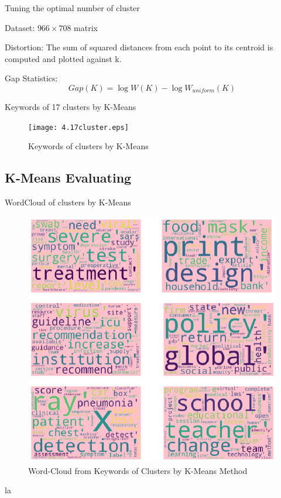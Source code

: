 \documentclass[9pt]{beamer}
\begin{document}
\begin{frame}{Tuning the optimal number of cluster}
    \item Dataset: $966\times708$ matrix 
    \item Distortion: The sum of squared distances from each point to its centroid is computed and plotted against k.
    \item{Gap Statistics: \begin{equation}
Gap(K) = \log W(K) - \log W_{uniform}(K)
\end{equation}}
    
\end{frame}
\begin{frame}{Keywords of 17 clusters by K-Means}

\begin{figure}
  \begin{minipage}[b]{1.1\textwidth}
    \texttt{[image: 4.17cluster.eps]}
    \caption{ Keywords of clusters by K-Means \label{4}}
  \end{minipage}
\end{figure}
\end{frame}
\subsection{K-Means Evaluating}
\begin{frame}{WordCloud of clusters by K-Means}

\begin{figure}
  \begin{minipage}[b]{0.8\textwidth}
    \includegraphics[width=0.8\columnwidth]{5_cloud.eps}
    \caption{ Word-Cloud from Keywords of Clusters by K-Means Method \label{2}}
  \end{minipage}
\end{figure}
la
\end{frame}
\end{document}
